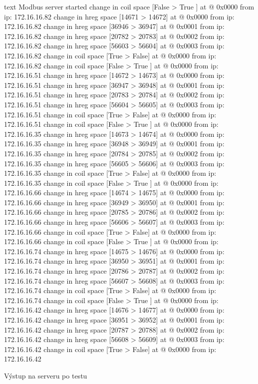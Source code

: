 \begin{listing}[htbp]
    \centering
    \begin{cminted}[breaklines,autogobble, fontsize=\footnotesize]{text}
Modbus server started
change in coil space [False > True ] at @ 0x0000 from ip: 172.16.16.82   
change in hreg space [14671 > 14672] at @ 0x0000 from ip: 172.16.16.82   
change in hreg space [36946 > 36947] at @ 0x0001 from ip: 172.16.16.82   
change in hreg space [20782 > 20783] at @ 0x0002 from ip: 172.16.16.82   
change in hreg space [56603 > 56604] at @ 0x0003 from ip: 172.16.16.82   
change in coil space [True  > False] at @ 0x0000 from ip: 172.16.16.82   
change in coil space [False > True ] at @ 0x0000 from ip: 172.16.16.51   
change in hreg space [14672 > 14673] at @ 0x0000 from ip: 172.16.16.51   
change in hreg space [36947 > 36948] at @ 0x0001 from ip: 172.16.16.51   
change in hreg space [20783 > 20784] at @ 0x0002 from ip: 172.16.16.51   
change in hreg space [56604 > 56605] at @ 0x0003 from ip: 172.16.16.51   
change in coil space [True  > False] at @ 0x0000 from ip: 172.16.16.51   
change in coil space [False > True ] at @ 0x0000 from ip: 172.16.16.35   
change in hreg space [14673 > 14674] at @ 0x0000 from ip: 172.16.16.35   
change in hreg space [36948 > 36949] at @ 0x0001 from ip: 172.16.16.35   
change in hreg space [20784 > 20785] at @ 0x0002 from ip: 172.16.16.35   
change in hreg space [56605 > 56606] at @ 0x0003 from ip: 172.16.16.35   
change in coil space [True  > False] at @ 0x0000 from ip: 172.16.16.35   
change in coil space [False > True ] at @ 0x0000 from ip: 172.16.16.66   
change in hreg space [14674 > 14675] at @ 0x0000 from ip: 172.16.16.66   
change in hreg space [36949 > 36950] at @ 0x0001 from ip: 172.16.16.66   
change in hreg space [20785 > 20786] at @ 0x0002 from ip: 172.16.16.66   
change in hreg space [56606 > 56607] at @ 0x0003 from ip: 172.16.16.66   
change in coil space [True  > False] at @ 0x0000 from ip: 172.16.16.66   
change in coil space [False > True ] at @ 0x0000 from ip: 172.16.16.74   
change in hreg space [14675 > 14676] at @ 0x0000 from ip: 172.16.16.74   
change in hreg space [36950 > 36951] at @ 0x0001 from ip: 172.16.16.74   
change in hreg space [20786 > 20787] at @ 0x0002 from ip: 172.16.16.74   
change in hreg space [56607 > 56608] at @ 0x0003 from ip: 172.16.16.74   
change in coil space [True  > False] at @ 0x0000 from ip: 172.16.16.74   
change in coil space [False > True ] at @ 0x0000 from ip: 172.16.16.42   
change in hreg space [14676 > 14677] at @ 0x0000 from ip: 172.16.16.42   
change in hreg space [36951 > 36952] at @ 0x0001 from ip: 172.16.16.42   
change in hreg space [20787 > 20788] at @ 0x0002 from ip: 172.16.16.42   
change in hreg space [56608 > 56609] at @ 0x0003 from ip: 172.16.16.42   
change in coil space [True  > False] at @ 0x0000 from ip: 172.16.16.42   
    \end{cminted}
\caption{Výstup na serveru po testu}
\label{listing:modbus_server_log}
\end{listing}

